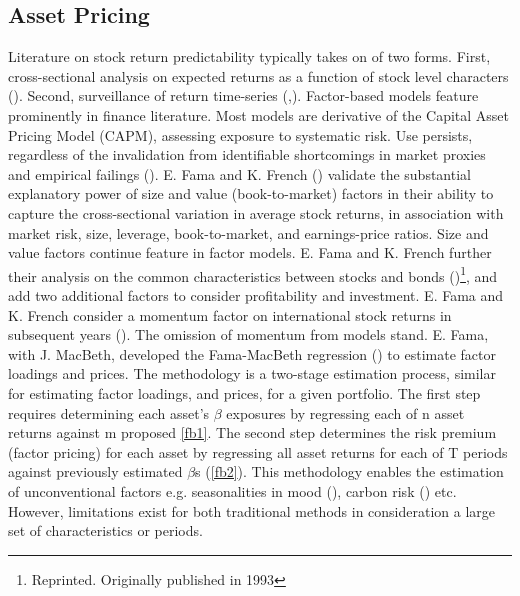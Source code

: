 \documentclass[12pt]{article}
\begin{document}
\subsection{Asset Pricing}
Literature on stock return predictability typically takes on of two forms.
First, cross-sectional analysis on expected returns as a function of stock level characters (\cite{fama2008dissecting}).
Second, surveillance of return time-series (\cite{koijen2011predictability},\cite{rapach2013forecasting}).
Factor-based models feature prominently in finance literature.
Most models are derivative of the Capital Asset Pricing Model (CAPM), assessing exposure to systematic risk.
Use persists, regardless of the invalidation from identifiable shortcomings in market proxies and empirical failings (\cite{fama2004capital}). 
E. Fama and K. French (\citeyear{eugene1992cross}) validate the substantial explanatory power of size and value (book-to-market) factors
in their ability to capture the cross-sectional variation in average stock returns, in association with market risk, size, leverage, book-to-market, and earnings-price ratios.
Size and value factors continue feature in factor models.
E. Fama and K. French further their analysis on the common characteristics between stocks and bonds (\cite{fama2021common})\footnote{Reprinted. Originally published in 1993}, 
and add two additional factors to consider profitability and investment.
E. Fama and K. French consider a momentum factor on international stock returns in subsequent years (\cite{fama2012size}).
The omission of momentum from models stand. 
E. Fama, with J. MacBeth, developed the Fama-MacBeth regression (\cite{fama1973risk}) to estimate factor loadings and prices.
The methodology is a two-stage estimation process, similar for estimating factor loadings, and prices, for a given portfolio.
The first step requires determining each asset's $\beta$ exposures by regressing each of n asset returns against m proposed \ref{fb1}.
The second step determines the risk premium (factor pricing) for each asset by regressing all asset returns for each of T periods against previously estimated $\beta$s (\ref{fb2}).
This methodology enables the estimation of unconventional factors e.g. seasonalities in mood (\cite{hirshleifer2020mood}), carbon risk (\cite{bolton2021investors}) etc.
However, limitations exist for both traditional methods in consideration a large set of characteristics or periods.
\end{document}
